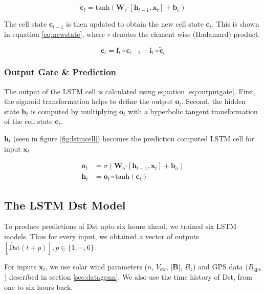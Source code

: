 \begin{equation}\label{eq:candidate}
 \tilde{\mathbf{c}}_{t} = \text{tanh} \left( \mathbf{W}_{c} \boldsymbol{\cdot}  \left[ \mathbf{h}_{t-1},\mathbf{x}_t \right] + 
 \mathbf{b}_{c} \right)
\end{equation}

The cell state  $\mathbf{c}_{t-1}$ is then updated to obtain the new cell state $\mathbf{c}_t$. This 
is shown in equation \ref{eq:newstate}, where $\circ$ denotes the element wise (Hadamard) product. 

\begin{equation}\label{eq:newstate}
 \mathbf{c}_t = \mathbf{f}_{t} \circ \mathbf{c}_{t-1} + \mathbf{i}_{t} \circ \tilde{\mathbf{c}}_{t}
\end{equation}

\subsubsection*{Output Gate \& Prediction}

The output of the LSTM cell is calculated using equation \ref{eq:outputgate}. First, the 
sigmoid transformation helps to define the output $\mathbf{o}_t$. Second, the hidden state $\mathbf{h}_t$ 
is computed by multiplying $\mathbf{o}_{t}$ with a hyperbolic tangent transformation of the cell state 
$\mathbf{c}_{t}$. 

$\mathbf{h}_{t}$ (seen in figure \ref{fig:lstmcell}) becomes the prediction computed LSTM cell for input 
$\mathbf{x}_t$


\begin{align} \label{eq:outputgate}
	\mathbf{o}_{t} &= \sigma \left( 
		\mathbf{W}_o \boldsymbol{\cdot} \left[\mathbf{h}_{t-1}, \mathbf{x}_{t} \right] + \mathbf{b}_o \right) \\
	\mathbf{h}_{t} &= \mathbf{o}_{t} \circ \text{tanh}(\mathbf{c}_t)
\end{align}

\subsection{The LSTM Dst Model}\label{sec:lstmDstArch}

To produce predictions of Dst upto six hours ahead, we trained six LSTM models. Thus for every input, we 
obtained a vector of outputs $[\mathrm{\hat{D}st}\left(t + p\right)], p\in \{ 1, \cdots, 6 \}$.

For inputs $\mathbf{x}_t$, we use solar wind parameters ($n$, $V_{\text{sw}}$, $|\mathbf{B}|$, $B_{z}$) 
and GPS data ($B_{\text{gps}}$) described in section \ref{sec:datagpnn}. We also use the time history of Dst, 
from one to six hours back.


